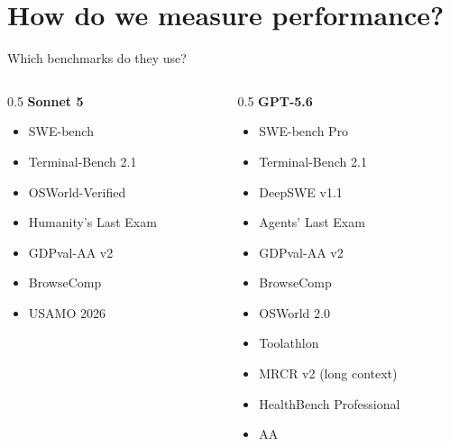 \documentclass[
  aspectratio=169,
  font=times,
  sectionpage=true,
]{tumbeamer}
\begin{document}

\section{How do we measure performance?}

\begin{frame}{Which benchmarks do they use?}
  \label{fr:benchmarks}
  \footnotesize
  \begin{columns}[T]
    \begin{column}{0.5\textwidth}
      \textbf{Sonnet 5}~\cite{anthropic2026sonnet5}
      \begin{itemize}\itemsep0pt
        \item SWE-bench~\cite{openai2024verified,deng2025swebenchpro,swebench2025multilingual,yang2024swebenchmm}
        \item Terminal-Bench 2.1~\cite{merrill2026terminalbench}
        \item OSWorld-Verified~\cite{xie2024osworld,xlang2025osworldverified}
        \item Humanity's Last Exam~\cite{phan2025hle}
        \item GDPval-AA v2~\cite{aa2026gdpvalaa,patwardhan2025gdpval}
        \item BrowseComp~\cite{wei2025browsecomp}
        \item USAMO 2026~\cite{petrov2025usamo,balunovic2025matharena}
      \end{itemize}
    \end{column}
    \begin{column}{0.5\textwidth}
      \textbf{GPT-5.6}~\cite{openai2026gpt56}
      \begin{itemize}\itemsep0pt
        \item SWE-bench Pro~\cite{deng2025swebenchpro}
        \item Terminal-Bench 2.1~\cite{merrill2026terminalbench}
        \item DeepSWE v1.1~\cite{datacurve2026deepswe}
        \item Agents' Last Exam~\cite{sun2026agentslastexam}
        \item GDPval-AA v2~\cite{aa2026gdpvalaa,patwardhan2025gdpval}
        \item BrowseComp~\cite{wei2025browsecomp}
        \item OSWorld 2.0~\cite{yuan2026osworld2}
        \item Toolathlon~\cite{li2025toolathlon}
        \item MRCR v2 (long context)~\cite{gemini2024mrcr,deepmind2026mrcrv2}
        \item HealthBench Professional~\cite{hicks2026healthbenchpro,arora2025healthbench}
        \item AA~\cite{aa2026intelligenceindex,aa2026codingindex}
      \end{itemize}
    \end{column}
  \end{columns}


\end{frame}
\end{document}
